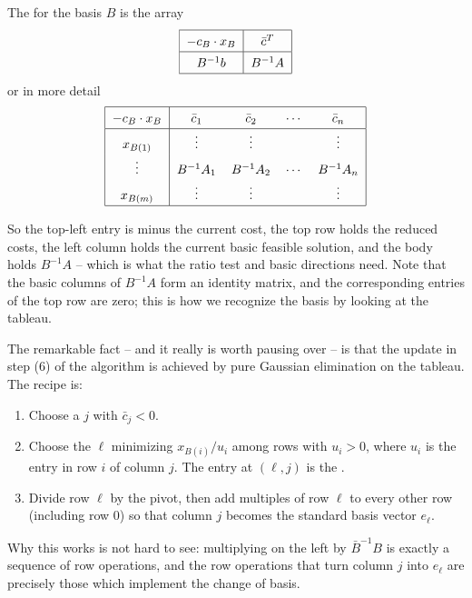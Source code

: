 \begin{definition}
    The  for the basis $B$ is the array
    $$
    \arraycolsep=6pt\def\arraystretch{1.4}
    \begin{array}{|c|c|}\hline
        -c_B\cdot x_B & \bar c^T \\\hline
        B^{-1}b & B^{-1}A \\\hline
    \end{array}
    $$
    or in more detail
    $$
    \arraycolsep=6pt\def\arraystretch{1.4}
    \begin{array}{|c|cccc|}\hline
        -c_B \cdot x_B & \bar c_1 & \bar c_2 & \cdots & \bar c_n \\\hline
        x_{B(1)} & \vdots & \vdots & & \vdots \\
        \vdots & B^{-1}A_1 & B^{-1}A_2 & \cdots & B^{-1}A_n\\
        x_{B(m)} & \vdots & \vdots & & \vdots\\\hline
    \end{array}
    $$
\end{definition}

So the top-left entry is minus the current cost, the top row holds the reduced costs, the left column holds the current basic feasible solution, and the body holds $B^{-1}A$ -- which is what the ratio test and basic directions need. Note that the basic columns of $B^{-1}A$ form an identity matrix, and the corresponding entries of the top row are zero; this is how we recognize the basis by looking at the tableau.

The remarkable fact -- and it really is worth pausing over -- is that the update in step (6) of the algorithm is achieved by pure Gaussian elimination on the tableau. The recipe is:
\begin{enumerate}[label=(\roman*)]
    \item Choose a  $j$ with $\bar c_j < 0$.
    \item Choose the  $\ell$ minimizing $x_{B(i)}/u_i$ among rows with $u_i > 0$, where $u_i$ is the entry in row $i$ of column $j$. The entry at $(\ell, j)$ is the .
    \item Divide row $\ell$ by the pivot, then add multiples of row $\ell$ to every other row (including row $0$) so that column $j$ becomes the standard basis vector $e_\ell$.
\end{enumerate}
Why this works is not hard to see: multiplying on the left by $\bar B^{-1}B$ is exactly a sequence of row operations, and the row operations that turn column $j$ into $e_\ell$ are precisely those which implement the change of basis.

